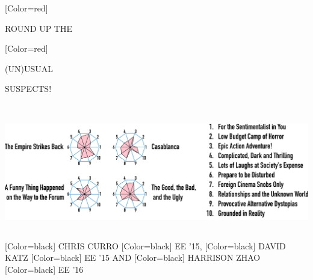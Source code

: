 \documentclass{article}
\begin{document}
\begin{minipage}[c]{20in}
{ 
[Color=red]
\fontsize{3in}{0.5in}\selectfont 
\bfseries





ROUND UP THE
}
{ 
[Color=red]
\fontsize{3.97in}{0.5in}\selectfont 
\bfseries

{ (UN)}USUAL 

\vspace{0.4in}

SUSPECTS!
}
\end{minipage}
\vspace{1in}\\
\colorbox{white}{
\begin{minipage}{21in}
\centering
\includegraphics[width=21in]{figure.pdf}
\end{minipage}
}
\vspace{1in}\\
{
[Color=black]
\fontsize{1in}{1em}\selectfont 
CHRIS CURRO
}
{
[Color=black]
\fontsize{0.8in}{1em}\selectfont 
EE '15,
}
{
[Color=black]
\fontsize{1in}{1em}\selectfont 
DAVID KATZ
}
{
[Color=black]
\fontsize{0.8in}{1em}\selectfont 
EE '15 AND
}
{
[Color=black]
\fontsize{1in}{1em}\selectfont 
HARRISON ZHAO
}
{
[Color=black]
\fontsize{0.8in}{1em}\selectfont 
EE '16
}

\vspace{0.2in}
\end{document}
